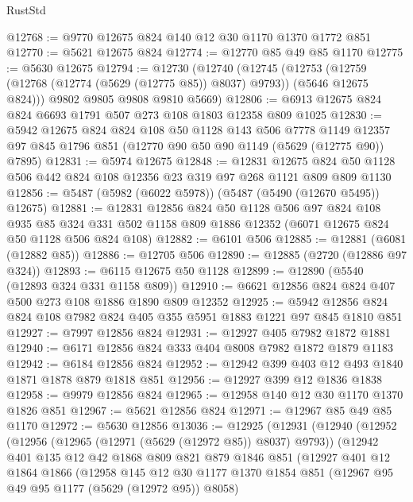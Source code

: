 \begin{lexlean}{RustStd}
\begin{coremodule}
@12768 := @9770 @12675 @824 @140 @12 @30 @1170 @1370 @1772 @851
@12770 := @5621 @12675 @824
@12774 := @12770 @85 @49 @85 @1170
@12775 := @5630 @12675
@12794 := @12730
    (@12740
      (@12745
        (@12753 (@12759 (@12768 (@12774 (@5629 (@12775 @85)) @8037) @9793)) (@5646 @12675 @824)))
      @9802
      @9805
      @9808
      @9810
      @5669)
@12806 := @6913 @12675 @824 @824 @6693 @1791 @507 @273 @108 @1803 @12358 @809 @1025
@12830 := @5942
    @12675
    @824
    @824
    @108
    @50
    @1128
    @143
    @506
    @7778
    @1149
    @12357
    @97
    @845
    @1796
    @851
    (@12770 @90 @50 @90 @1149 (@5629 (@12775 @90)) @7895)
@12831 := @5974 @12675
@12848 := @12831
    @12675
    @824
    @50
    @1128
    @506
    @442
    @824
    @108
    @12356
    @23
    @319
    @97
    @268
    @1121
    @809
    @809
    @1130
@12856 := @5487 (@5982 (@6022 @5978)) (@5487 (@5490 (@12670 @5495)) @12675)
@12881 := @12831
    @12856
    @824
    @50
    @1128
    @506
    @97
    @824
    @108
    @935
    @85
    @324
    @331
    @502
    @1158
    @809
    @1886
    @12352
    (@6071 @12675 @824 @50 @1128 @506 @824 @108)
@12882 := @6101 @506
@12885 := @12881 (@6081 (@12882 @85))
@12886 := @12705 @506
@12890 := @12885 (@2720 (@12886 @97 @324))
@12893 := @6115 @12675 @50 @1128
@12899 := @12890 (@5540 (@12893 @324 @331 @1158 @809))
@12910 := @6621 @12856 @824 @824 @407 @500 @273 @108 @1886 @1890 @809 @12352
@12925 := @5942 @12856 @824 @824 @108 @7982 @824 @405 @355 @5951 @1883 @1221 @97 @845 @1810 @851
@12927 := @7997 @12856 @824
@12931 := @12927 @405 @7982 @1872 @1881
@12940 := @6171 @12856 @824 @333 @404 @8008 @7982 @1872 @1879 @1183
@12942 := @6184 @12856 @824
@12952 := @12942 @399 @403 @12 @493 @1840 @1871 @1878 @879 @1818 @851
@12956 := @12927 @399 @12 @1836 @1838
@12958 := @9979 @12856 @824
@12965 := @12958 @140 @12 @30 @1170 @1370 @1826 @851
@12967 := @5621 @12856 @824
@12971 := @12967 @85 @49 @85 @1170
@12972 := @5630 @12856
@13036 := @12925
    (@12931
      (@12940
        (@12952
          (@12956 (@12965 (@12971 (@5629 (@12972 @85)) @8037) @9793))
          (@12942
            @401
            @135
            @12
            @42
            @1868
            @809
            @821
            @879
            @1846
            @851
            (@12927
              @401
              @12
              @1864
              @1866
              (@12958
                @145
                @12
                @30
                @1177
                @1370
                @1854
                @851
                (@12967 @95 @49 @95 @1177 (@5629 (@12972 @95)) @8058)

\end{coremodule}
\end{lexlean}
